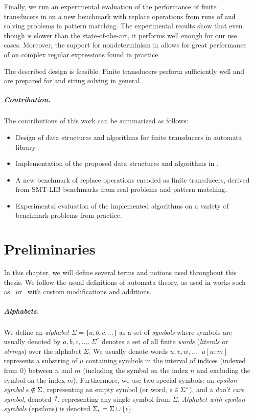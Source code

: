 Finally, we run an experimental evaluation of the performance of finite transducers in \mata on a new benchmark with replace operations from runs of \noodler and solving problems in pattern matching.
The experimental results show that even though \mata is slower than the state-of-the-art, it performs well enough for our use cases.
Moreover, the support for nondeterminism in \mata allows for great performance of \nfts on complex regular expressions found in practice.

The described design is feasible.
Finite transducers perform sufficiently well and are prepared for \noodler and string solving in general.

\paragraph{Contribution.}
The contributions of this work can be summarized as follows:
\begin{itemize}
  \item Design of data structures and algorithms for finite transducers in automata library \mata.
  \item Implementation of the proposed data structures and algorithms in \mata.
  \item A new benchmark of replace operations encoded as finite transducers, derived from SMT-LIB benchmarks from real problems and pattern matching.
  \item Experimental evaluation of the implemented algorithms on a variety of benchmark problems from practice.
\end{itemize}

\chapter{Preliminaries}
\label{sec:Preliminaries}
In this chapter, we will define several terms and notions used throughout this thesis.
We follow the usual definitions of automata theory, as used in works such as~\cite{Esparza} or~\cite{Sipser} with custom modifications and additions.

\paragraph{Alphabets.}
We define an \emph{alphabet} $\Sigma = \{ a, b, c, \ldots \}$ as a set of \emph{symbols} where
symbols are usually denoted by $a, b, c, \ldots$.
$\Sigma^*$ denotes a set of all finite \emph{words} (\emph{literals} or \emph{strings}) over the alphabet $\Sigma$.
We usually denote words $u, v, w, \ldots$.
$u[n:m]$ represents a substring of $u$ containing symbols in the interval of indices (indexed from 0) between $n$ and $m$ (including the symbol on the index $n$ and excluding the symbol on the index $m$).
Furthermore, we use two special symbols: an \emph{epsilon symbol} $\epsilon \notin \Sigma$, representing an empty symbol (or word, $\epsilon \in \Sigma^*$), and a \emph{don't care symbol}, denoted $?$, representing any single symbol from $\Sigma$.
\emph{Alphabet with epsilon symbols} (epsilons) is denoted $\Sigma_\epsilon = \Sigma \cup \{ \epsilon \}$.

